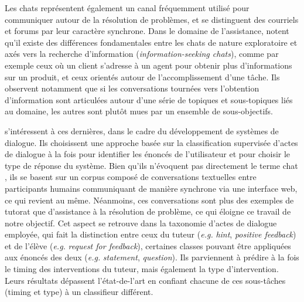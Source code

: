 \documentclass[10pt,a4paper,twoside]{article}
\begin{document}
Les chats représentent également un canal fréquemment utilisé pour communiquer autour de la résolution de problèmes, et se distinguent des courriels et forums par leur caractère synchrone. Dans le domaine de l'assistance, \citet{stede2004information} notent qu'il existe des différences fondamentales entre les chats de nature exploratoire et axés vers la recherche d'information (\textit{information-seeking chats}), comme par exemple ceux où un client s'adresse à un agent pour obtenir plus d'informations sur un produit, et ceux orientés autour de l'accomplissement d'une tâche. Ils observent notamment que si les conversations tournées vers l'obtention d'information sont articulées autour d'une série de topiques et sous-topiques liés au domaine, les autres sont plutôt mues par un ensemble de sous-objectifs.

\citet{ha2013learning} s'intéressent à ces dernières, dans le cadre du développement de systèmes de dialogue. Ils choisissent une approche basée sur la classification supervisée d'actes de dialogue à la fois pour identifier les énoncés de l'utilisateur et pour choisir le type de réponse du système. Bien qu'ils n'évoquent pas directement le terme \og chat \fg, ils se basent sur un corpus composé de conversations textuelles entre participants humains communiquant de manière synchrone via une interface web, ce qui revient au même. Néanmoins, ces conversations sont plus des exemples de tutorat que d'assistance à la résolution de problème, ce qui éloigne ce travail de notre objectif. Cet aspect se retrouve dans la taxonomie d'actes de dialogue employée, qui fait la distinction entre ceux du tuteur (\textit{e.g.} \textit{hint}, \textit{positive feedback}) et de l'élève (\textit{e.g.} \textit{request for feedback}), certaines classes pouvant être appliquées aux énoncés des deux (\textit{e.g.} \textit{statement}, \textit{question}). Ils parviennent à prédire à la fois le timing des interventions du tuteur, mais également la type d'intervention. Leurs résultats dépassent l'état-de-l'art en confiant chacune de ces sous-tâches (timing et type) à un classifieur différent.
\end{document}
